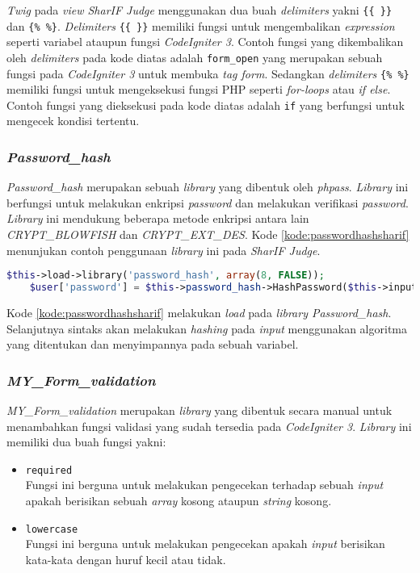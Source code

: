 \textit{Twig} pada \textit{view SharIF Judge} menggunakan dua buah \textit{delimiters} yakni \verb|{{ }}| dan \verb|{% %}|. \textit{Delimiters} \verb|{{ }}| memiliki fungsi untuk mengembalikan \textit{expression} seperti variabel ataupun fungsi \textit{CodeIgniter 3}. Contoh fungsi yang dikembalikan oleh \textit{delimiters} pada kode diatas adalah \texttt{form\_open} yang merupakan sebuah fungsi pada \textit{CodeIgniter 3} untuk membuka \textit{tag form}. Sedangkan \textit{delimiters} \verb|{% %}| memiliki fungsi untuk mengeksekusi fungsi PHP seperti \textit{for-loops} atau \textit{if else}. Contoh fungsi yang dieksekusi pada kode diatas adalah \texttt{if} yang berfungsi untuk mengecek kondisi tertentu.

\subsubsection{\textit{Password\_hash}}
\textit{Password\_hash} merupakan sebuah \textit{library} yang dibentuk oleh \textit{phpass}. \textit{Library} ini berfungsi untuk melakukan enkripsi \textit{password} dan melakukan verifikasi \textit{password}. \textit{Library} ini mendukung beberapa metode enkripsi antara lain \textit{CRYPT\_BLOWFISH} dan \textit{CRYPT\_EXT\_DES}. Kode \ref{kode:passwordhashsharif} menunjukan contoh penggunaan \textit{library} ini pada \textit{SharIF Judge}.

\begin{lstlisting}[language=PHP, caption=Contoh kode penggunaan \textit{Library Password\_hash}, label=kode:passwordhashsharif]
	$this->load->library('password_hash', array(8, FALSE));
	$user['password'] = $this->password_hash->HashPassword($this->input->post('password'));
\end{lstlisting}

Kode \ref{kode:passwordhashsharif} melakukan \textit{load} pada \textit{library Password\_hash}. Selanjutnya sintaks akan melakukan \textit{hashing} pada \textit{input} menggunakan algoritma yang ditentukan dan menyimpannya pada sebuah variabel.

\subsubsection{\textit{MY\_Form\_validation}}
\textit{MY\_Form\_validation} merupakan \textit{library} yang dibentuk secara manual untuk menambahkan fungsi validasi yang sudah tersedia pada \textit{CodeIgniter 3}. \textit{Library} ini memiliki dua buah fungsi yakni:
\begin{itemize}
	\item \texttt{required}\\ Fungsi ini berguna untuk melakukan pengecekan terhadap sebuah \textit{input} apakah berisikan sebuah \textit{array} kosong ataupun \textit{string} kosong.
	\item \texttt{lowercase} \\ Fungsi ini berguna untuk melakukan pengecekan apakah \textit{input} berisikan kata-kata dengan huruf kecil atau tidak.
\end{itemize}
